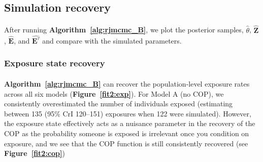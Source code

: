 \subsection{Simulation recovery }
\paragraph{}After running \textbf{Algorithm~\ref{alg:rjmcmc_B}}, we plot the posterior samples, $\hat{\theta}$, $\hat{\mathbf{Z}}$,  $\hat{\mathbf{E}}$, and  $\hat{\mathbf{E}^\tau}$ and compare with the simulated parameters.

\subsubsection{Exposure state recovery}
\paragraph{} \textbf{Algorithm~\ref{alg:rjmcmc_B}} can recover the population-level exposure rates across all six models (\textbf{Figure~\ref{fit2:exp}}). For Model A (no COP), we consistently overestimated the number of individuals exposed (estimating between 135 (95\% CrI 120–151) exposures when 122 were simulated). However, the exposure state effectively acts as a nuisance parameter in the recovery of the COP as the probability someone is exposed is irrelevant once you condition on exposure, and we see that the COP function is still consistently recovered (see \textbf{Figure~\ref{fit2:cop}}) %

